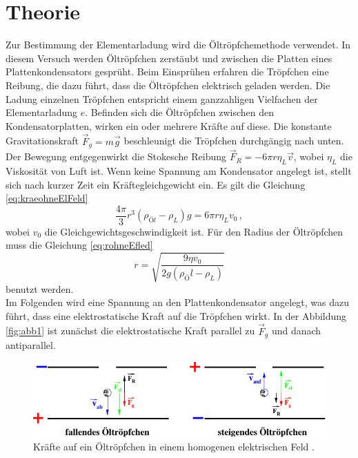 \section{Theorie}
\label{sec:Theorie}

Zur Bestimmung der Elementarladung wird die Öltröpfchemethode verwendet. In diesem Versuch werden Öltröpfchen zerstäubt und zwischen die Platten eines Plattenkondensators gesprüht.
Beim Einsprühen erfahren die Tröpfchen eine Reibung, die dazu führt, dass die Öltröpfchen elektrisch geladen werden.
Die Ladung einzelnen Tröpfchen entspricht einem ganzzahligen Vielfachen der Elementarladung $e$.
Befinden sich die Öltröpfchen zwischen den Kondensatorplatten, wirken ein oder mehrere Kräfte auf diese. 
Die konstante Gravitationskraft $\vec{F}_g = m \vec{g}$ beschleunigt die Tröpfchen durchgängig nach unten.
Der Bewegung entgegenwirkt die Stokesche Reibung $\vec{F}_R = -6 \pi r \eta_L \vec{v}$, wobei $\eta_L$ die Viskosität von Luft ist.
Wenn keine Spannung am Kondensator angelegt ist, stellt sich nach kurzer Zeit ein Kräftegleichgewicht ein.
Es gilt die Gleichung \eqref{eq:kraeohneElFeld}
\begin{equation}
    \frac{4 \pi}{3} r^3(\rho_{Öl} - \rho_L)g = 6 \pi r \eta_L v_0 \, ,
    \label{eq:kraeohneElFeld}
\end{equation}
wobei $v_0$ die Gleichgewichtsgeschwindigkeit ist. Für den Radius der Öltröpfchen muss die Gleichung \eqref{eq:rohneEfled}
\begin{equation}
    r = \sqrt{\frac{9 \eta v_0}{2 g (\rho_Öl - \rho_L)}}
    \label{eq:rohneEfled}
\end{equation}
benutzt werden.\\

Im Folgenden wird eine Spannung an den Plattenkondensator angelegt, was dazu führt, dass eine elektrostatische Kraft auf die Tröpfchen wirkt.
In der Abbildung \autoref{fig:abb1} ist zunächst die elektrostatische Kraft parallel zu $\vec{F}_g$ und danach antiparallel.


\begin{figure}[H]
    \centering
    \includegraphics{figures/Abb1.pdf}
    \caption{Kräfte auf ein Öltröpfchen in einem homogenen elektrischen Feld \cite{ap12}.}
    \label{fig:abb1}
\end{figure}


